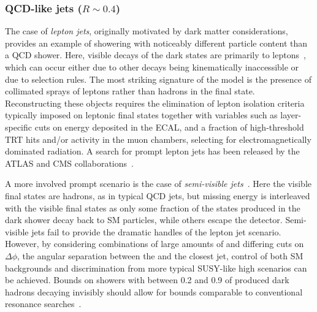 %
\subsubsection{QCD-like jets ($R \sim 0.4$)} %
\label{sec:darkshowerthinjet}

The case of \emph{lepton jets}, originally motivated by dark matter considerations, provides an example of showering with noticeably different particle content than a QCD shower. Here, visible decays of the dark states are primarily to leptons~\cite{Falkowski:2010cm,Falkowski:2010gv}, which can occur either due to other decays being kinematically inaccessible or due to selection rules. The most striking signature of the model is the presence of collimated sprays of leptons rather than hadrons in the final state. Reconstructing these objects requires the elimination of lepton isolation criteria typically imposed on leptonic final states together with variables such as layer-specific cuts on energy deposited in the ECAL, and a fraction of high-threshold TRT hits and/or activity in the muon chambers, selecting for electromagnetically dominated radiation. A search for prompt lepton jets has been released by the ATLAS and CMS collaborations~\cite{Chatrchyan:2011hr,Aad:2015sms}.

A more involved prompt scenario is the case of  \emph{semi-visible jets}~\cite{Cohen:2015toa}.  Here the visible final states are hadrons, as in typical QCD jets, but missing energy is interleaved with the visible final states as only some fraction of the states produced in the dark shower decay back to SM particles, while others escape the detector. Semi-visible jets fail to provide the dramatic handles of the lepton jet scenario. However, by considering combinations of large amounts of \MET and differing cuts on $\Delta\phi$, the angular separation between the \MET and the closest jet, control of both SM backgrounds and discrimination from more typical SUSY-like high \MET scenarios can be achieved. Bounds on showers with between 0.2 and 0.9 of produced dark hadrons decaying invisibly should allow for bounds comparable to conventional resonance searches~\cite{Cohen:2017pzm}.

